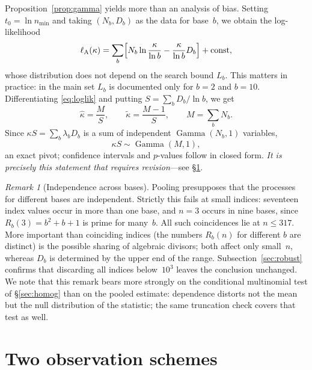 \documentclass[11pt,a4paper]{article}
\theoremstyle{plain}
\theoremstyle{remark}
\newtheorem{remark}{Remark}
\newcommand{\Rb}{R_b}
\DeclareMathOperator{\Gam}{Gamma}
\begin{document}
Proposition~\ref{prop:gamma} yields more than an analysis of bias. Setting
$t_0=\ln n_{\min}$ and taking $(N_b,D_b)$ as the data for base~$b$, we obtain
the log-likelihood
\begin{equation}\label{eq:loglik}
\ell_{\mathrm A}(\kappa)=\sum_b\Bigl[N_b\ln\frac{\kappa}{\ln b}-\frac{\kappa}{\ln b}D_b\Bigr]+\mathrm{const},
\end{equation}
whose distribution does not depend on the search bound $L_b$. This matters in
practice: in the main set $L_b$ is documented only for $b=2$ and $b=10$.
Differentiating
\eqref{eq:loglik} and putting $S=\sum_b D_b/\ln b$, we get
\begin{equation}\label{eq:mle}
\hat\kappa=\frac{M}{S},\qquad \tilde\kappa=\frac{M-1}{S},\qquad M=\sum_b N_b .
\end{equation}
Since $\kappa S=\sum_b\lambda_bD_b$ is a sum of independent $\Gam(N_b,1)$
variables,
\begin{equation}\label{eq:pivot}
\kappa S\sim\Gam(M,1),
\end{equation}
an exact pivot; confidence intervals and $p$-values follow in closed form.
\emph{It is precisely this statement that requires revision}---see
\S\ref{sec:scheme}.

\begin{remark}[Independence across bases]\label{rem:indep}
Pooling presupposes that the processes for different bases are independent.
Strictly this fails at small indices: seventeen index values occur in more than
one base, and $n=3$ occurs in nine bases, since $\Rb(3)=b^2+b+1$ is prime for
many~$b$. All such coincidences lie at $n\le317$. More important than coinciding
indices (the numbers $\Rb(n)$ for different $b$ are distinct) is the possible
sharing of algebraic divisors; both affect only small~$n$, whereas $D_b$ is
determined by the upper end of the range. Subsection~\ref{sec:robust} confirms that
discarding all indices below~$10^3$ leaves the conclusion unchanged. We note that
this remark bears more strongly on the conditional multinomial test of
\S\ref{sec:homog} than on the pooled estimate: dependence distorts not the mean
but the null distribution of the statistic; the same truncation check covers
that test as well.
\end{remark}

\section{Two observation schemes}\label{sec:scheme}
\end{document}
